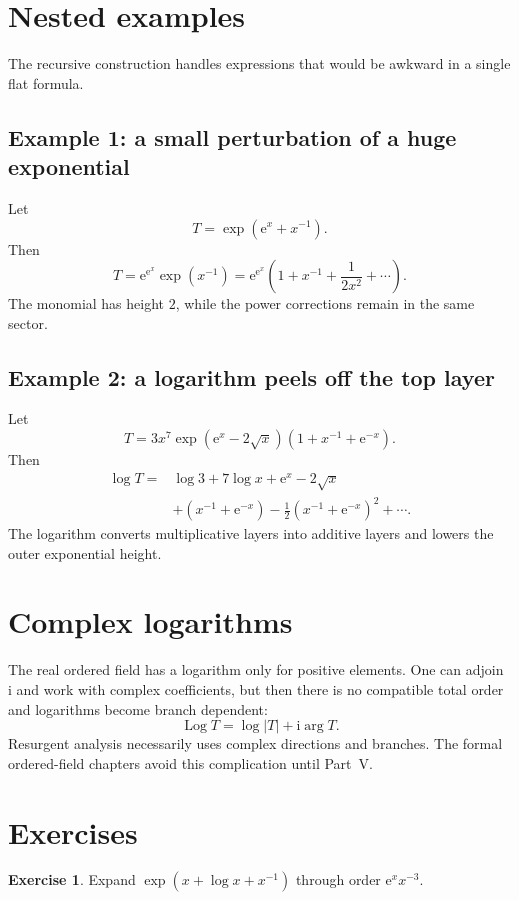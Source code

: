 \documentclass[11pt,openany]{book}
\theoremstyle{definition}
\newtheorem{exercise}{Exercise}[chapter]
\theoremstyle{plain}
\theoremstyle{remark}
\newcommand{\e}{\mathrm{e}}
\newcommand{\ii}{\mathrm{i}}
\DeclareMathOperator{\Log}{Log}
\begin{document}
\section{Nested examples}

The recursive construction handles expressions that would be awkward in a single flat formula.

\subsection*{Example 1: a small perturbation of a huge exponential}

Let
\[
 T=\exp\!\left(\e^x+x^{-1}\right).
\]
Then
\[
 T=\e^{\e^x}\exp(x^{-1})
 =\e^{\e^x}\left(1+x^{-1}+\frac1{2x^2}+\cdots\right).
\]
The monomial has height $2$, while the power corrections remain in the same sector.

\subsection*{Example 2: a logarithm peels off the top layer}

Let
\[
 T=3x^7\exp\!\left(\e^x-2\sqrt{x}\right)
 \left(1+x^{-1}+\e^{-x}\right).
\]
Then
\begin{align*}
 \log T={}&\log3+7\log x+\e^x-2\sqrt{x}\\
 &+\left(x^{-1}+\e^{-x}\right)
 -\frac12\left(x^{-1}+\e^{-x}\right)^2+\cdots.
\end{align*}
The logarithm converts multiplicative layers into additive layers and lowers the outer exponential height.

\section{Complex logarithms}

The real ordered field has a logarithm only for positive elements. One can adjoin $\ii$ and work with complex coefficients, but then there is no compatible total order and logarithms become branch dependent:
\[
 \Log T=\log|T|+\ii\arg T.
\]
Resurgent analysis necessarily uses complex directions and branches. The formal ordered-field chapters avoid this complication until Part~V.

\section{Exercises}

\begin{exercise}
Expand $\exp(x+\log x+x^{-1})$ through order $\e^x x^{-3}$.
\end{exercise}
\end{document}
